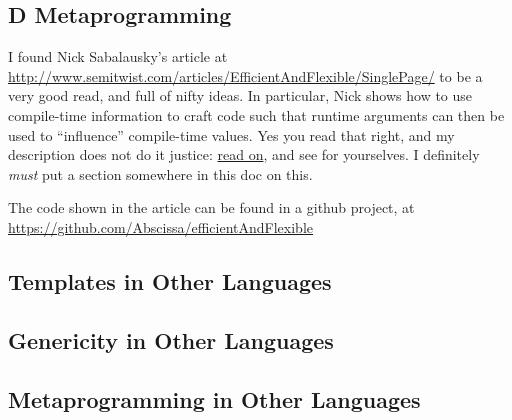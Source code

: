 \subsection{D Metaprogramming}

I found Nick Sabalausky's article at \url{http://www.semitwist.com/articles/EfficientAndFlexible/SinglePage/} to be a very good read, and full of nifty ideas. In particular, Nick shows how to use compile-time information to craft code such that runtime arguments can then be used to ``influence'' compile-time values. Yes you read that right, and my description does not do it justice: \href{http://www.semitwist.com/articles/EfficientAndFlexible/SinglePage/#part6-3}{read on}, and see for yourselves. I definitely \emph{must} put a section somewhere in this doc on this.

The code shown in the article can be found in a github project, at \url{https://github.com/Abscissa/efficientAndFlexible}

\subsection{Templates in Other Languages}


\subsection{Genericity in Other Languages}


\subsection{Metaprogramming in Other Languages}



